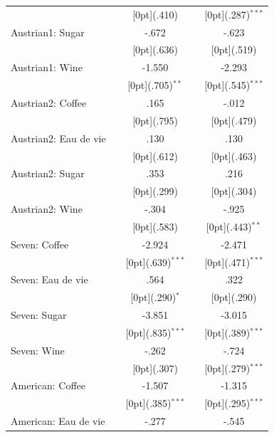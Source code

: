 \documentclass[12pt,a4paper,titlepage]{article}
\begin{document}
{\begin{tabular*}{\textwidth}{@{\extracolsep{\fill}}lcccc}
&	&	\raisebox{.7ex}[0pt]{\scriptsize (.410)} &	&	\raisebox{.7ex}[0pt]{\scriptsize (.287)$^{***}$} \\
Austrian1: Sugar &	&	-.672 &	&	-.623 \\
&	&	\raisebox{.7ex}[0pt]{\scriptsize (.636)} &	&	\raisebox{.7ex}[0pt]{\scriptsize (.519)} \\
Austrian1: Wine &	&	-1.550 &	&	-2.293 \\
&	&	\raisebox{.7ex}[0pt]{\scriptsize (.705)$^{**}$} &	&	\raisebox{.7ex}[0pt]{\scriptsize (.545)$^{***}$} \\
Austrian2: Coffee &	&	.165 &	&	-.012 \\
&	&	\raisebox{.7ex}[0pt]{\scriptsize (.795)} &	&	\raisebox{.7ex}[0pt]{\scriptsize (.479)} \\
Austrian2: Eau de vie &	&	.130 &	&	.130 \\
&	&	\raisebox{.7ex}[0pt]{\scriptsize (.612)} &	&	\raisebox{.7ex}[0pt]{\scriptsize (.463)} \\
Austrian2: Sugar &	&	.353 &	&	.216 \\
&	&	\raisebox{.7ex}[0pt]{\scriptsize (.299)} &	&	\raisebox{.7ex}[0pt]{\scriptsize (.304)} \\
Austrian2: Wine &	&	-.304 &	&	-.925 \\
&	&	\raisebox{.7ex}[0pt]{\scriptsize (.583)} &	&	\raisebox{.7ex}[0pt]{\scriptsize (.443)$^{**}$} \\
Seven: Coffee &	&	-2.924 &	&	-2.471 \\
&	&	\raisebox{.7ex}[0pt]{\scriptsize (.639)$^{***}$} &	&	\raisebox{.7ex}[0pt]{\scriptsize (.471)$^{***}$} \\
Seven: Eau de vie &	&	.564 &	&	.322 \\
&	&	\raisebox{.7ex}[0pt]{\scriptsize (.290)$^{*}$} &	&	\raisebox{.7ex}[0pt]{\scriptsize (.290)} \\
Seven: Sugar &	&	-3.851 &	&	-3.015 \\
&	&	\raisebox{.7ex}[0pt]{\scriptsize (.835)$^{***}$} &	&	\raisebox{.7ex}[0pt]{\scriptsize (.389)$^{***}$} \\
Seven: Wine &	&	-.262 &	&	-.724 \\
&	&	\raisebox{.7ex}[0pt]{\scriptsize (.307)} &	&	\raisebox{.7ex}[0pt]{\scriptsize (.279)$^{***}$} \\
American: Coffee &	&	-1.507 &	&	-1.315 \\
&	&	\raisebox{.7ex}[0pt]{\scriptsize (.385)$^{***}$} &	&	\raisebox{.7ex}[0pt]{\scriptsize (.295)$^{***}$} \\
American: Eau de vie &	&	-.277 &	&	-.545 \\

\end{tabular*}}
\end{document}
